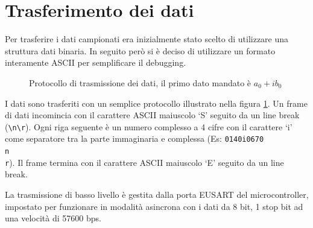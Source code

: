 \section{Trasferimento dei dati}
Per trasferire i dati campionati era inizialmente stato scelto di utilizzare
una struttura dati binaria. In seguito per\`o si \`e deciso di utilizzare un
formato interamente ASCII per semplificare il debugging.

\begin{figure}[H] \centering
    \caption[Protocollo di trasmissione dei dati]{
        Protocollo di trasmissione dei dati, il primo dato mandato \`e
        \(a_0+ib_0\)
        \label{fig:proto}
    }
\end{figure}
I dati sono trasferiti con un semplice protocollo illustrato nella figura
\ref{fig:proto}. Un frame di dati incomincia con il carattere ASCII maiuscolo
`S' seguito da un line break (\texttt{\textbackslash n\textbackslash r}). Ogni
riga seguente \`e un numero complesso a 4 cifre con il carattere `i' come
separatore tra la parte immaginaria e complessa (Es: \texttt{0140i0670\\n\\r}).
Il frame termina con il carattere ASCII maiuscolo `E' seguito da un line break.

La trasmissione di basso livello \`e gestita dalla porta EUSART del
microcontroller, impostato per funzionare in modalit\`a asincrona con i dati
da 8 bit, 1 stop bit ad una velocit\`a di 57600 bps.

